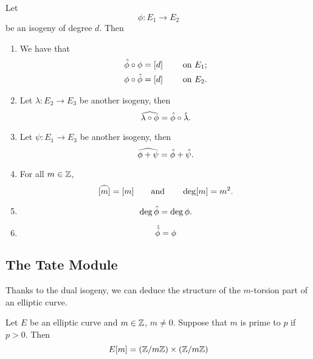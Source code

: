 \begin{theorem}
	Let
	\begin{equation*}
		\phi: E_1 \to E_2
	\end{equation*}
	be an isogeny of degree $d$. Then 
	\begin{enumerate}[label=(\alph*)]
		\item We have that
			\begin{align*}
				\Hat\phi \circ \phi &= [d] \qquad \textrm { on } E_1;\\
				\phi \circ \Hat\phi &= [d] \qquad \textrm { on } E_2.
			\end{align*}
		\item Let $\lambda: E_2 \to E_3$ be another isogeny, then
			\begin{equation*}
				\widehat{\lambda\circ\phi} = \Hat\phi \circ \Hat\lambda.
			\end{equation*}
		\item Let $\psi: E_1 \to E_3$ be another isogeny, then
			\begin{equation*}
				\widehat{\phi + \psi} = \Hat\phi + \Hat\psi.
			\end{equation*}
		\item For all $m \in \mathbb{Z}$,
			\begin{equation*}
				\widehat{[m]} = [m]
				\qquad\text{and}\qquad
				\deg [m] = m^2.
			\end{equation*}
		\item 
			\begin{equation*}
				\deg \Hat \phi = \deg \phi.
			\end{equation*}
		\item
			\begin{equation*}
				\Hat{\Hat{\phi}} = \phi
			\end{equation*}
	\end{enumerate}
\end{theorem}

\subsection{The Tate Module}


Thanks to the dual isogeny, we can deduce the structure of
the $m$-torsion part of an elliptic curve.
\begin{proposition}
	\label{prop:E-m-structure}
	Let $E$ be an elliptic curve and $m \in \mathbb{Z}$, $m \neq 0$.
	Suppose that $m$
	is prime to $p$ if $p > 0$. Then
	\begin{equation*}
		E[m] = (\mathbb{Z}/m\mathbb{Z})\times (\mathbb{Z}/m\mathbb{Z})
	\end{equation*}
\end{proposition}

